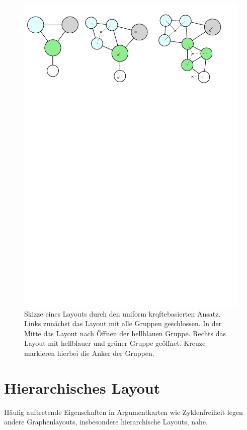 \begin{figure}[h!]
\begin{center}
	\includegraphics[width=\textwidth]{Pics/uniform_kb.pdf}
	\caption{Skizze eines Layouts durch den uniform krqftebasierten Ansatz. Links zunächst das Layout mit alle Gruppen geschlossen. In der Mitte das Layout nach Öffnen der hellblauen Gruppe. Rechts das Layout mit hellblauer und grüner Gruppe geöffnet. Kreuze markieren hierbei die Anker der Gruppen.}
	\label{UniformK-Skizze}
\end{center}
\end{figure}


\section{Hierarchisches Layout}
\label{Hierarch-Ansatz}
Häufig auftretende Eigenschaften in Argumentkarten wie Zyklenfreiheit legen andere Graphenlayouts, insbesondere hierarchische Layouts, nahe.

